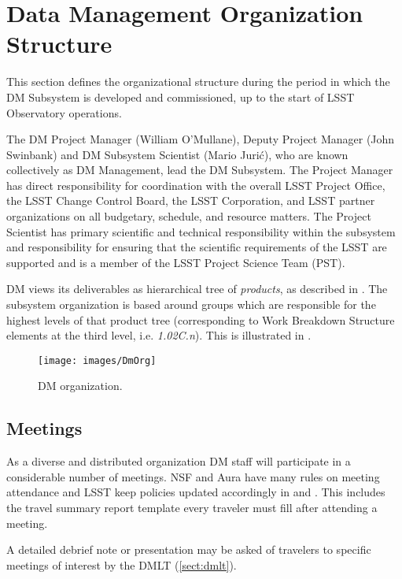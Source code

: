 \section{Data Management Organization Structure}

This section defines the organizational structure during the period in which the DM Subsystem is developed and commissioned, up to the start of LSST Observatory operations.

The DM Project Manager (William O'Mullane), Deputy Project Manager (John Swinbank) and DM Subsystem Scientist (Mario Juri\'c), who are known collectively as DM Management, lead the DM Subsystem.
The Project Manager has direct responsibility for coordination with the overall LSST Project Office, the LSST Change Control Board, the LSST Corporation, and LSST partner organizations on all budgetary, schedule, and resource matters.
The Project Scientist has primary scientific and technical responsibility within the subsystem and responsibility for ensuring that the scientific requirements of the LSST are supported and is a member of the LSST Project Science Team (PST).

DM views its deliverables as hierarchical tree of \textit{products}, as described in
.
The subsystem organization is based around groups which are responsible for the highest levels of that product tree (corresponding to Work Breakdown Structure elements at the third level, i.e.
\textit{1.02C.n}).
This is illustrated in .

\begin{figure}[htbp]
\begin{center}
 \texttt{[image: images/DmOrg]}
\caption{DM organization. \label{fig:dmorg}}
\end{center}
\end{figure}

\subsection {Meetings } \label{sect:meetings}
As a diverse and distributed organization DM staff will participate in a considerable number of meetings.
NSF and Aura have many rules on meeting attendance and LSST keep policies updated accordingly in  and . This includes the travel summary report template  every traveler must fill after attending a meeting.

A detailed debrief note or presentation may be asked of travelers to specific meetings of interest by the DMLT (\ref{sect:dmlt}).

